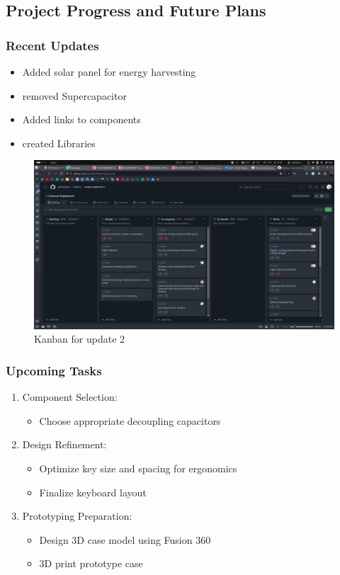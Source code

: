 \documentclass[a4paper,11pt]{article}%
\begin{document}
\subsection{Project Progress and Future Plans}
\subsubsection{Recent Updates}
\begin{itemize}
    \item Added solar panel for energy harvesting
    \item removed Supercapacitor
    \item Added links to components
    \item created Libraries
\end{itemize}
\begin{figure}[H]
	\centering
	\includegraphics[scale=0.22]{figures/kanban_2.png}
	\caption{Kanban for update 2}
\end{figure}


\subsubsection{Upcoming Tasks}
\begin{enumerate}
    \item Component Selection:
    \begin{itemize}
        \item Choose appropriate decoupling capacitors
    \end{itemize}
    \item Design Refinement:
    \begin{itemize}
        \item Optimize key size and spacing for ergonomics
        \item Finalize keyboard layout
    \end{itemize}
    \item Prototyping Preparation:
    \begin{itemize}
        \item Design 3D case model using Fusion 360
        \item 3D print prototype case
    \end{itemize}
\end{enumerate}
\end{document}
